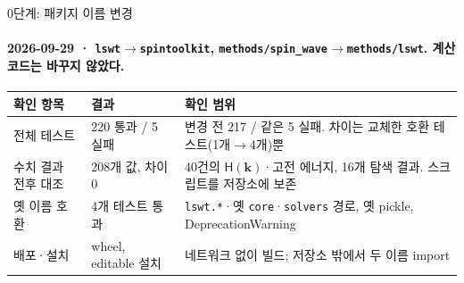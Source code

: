 \begin{frame}[label=rename-verification]{0단계: 패키지 이름 변경}
  \framesubtitle{2026-09-29 · \texttt{lswt}$\to$\texttt{spintoolkit}, \texttt{methods/spin\_wave}$\to$\texttt{methods/lswt}. 계산 코드는 바꾸지 않았다.}
  \begin{tabularx}{\textwidth}{@{}p{3.4cm}p{3.4cm}Y@{}}
    \toprule
    확인 항목 & 결과 & 확인 범위 \\
    \midrule
    전체 테스트 & 220 통과 / 5 실패 & 변경 전 217 / 같은 5 실패. 차이는 교체한 호환 테스트(1개$\to$4개)뿐 \\
    수치 결과 전후 대조 & 208개 값, 차이 0 & 40건의 $\mathsf H(\mathbf k)$·고전 에너지, 16개 탐색 결과. 스크립트를 저장소에 보존 \\
    옛 이름 호환 & 4개 테스트 통과 & \texttt{lswt.*}·옛 \texttt{core}·\texttt{solvers} 경로, 옛 pickle, DeprecationWarning \\
    배포·설치 & wheel, editable 설치 & 네트워크 없이 빌드; 저장소 밖에서 두 이름 import \\
    \bottomrule
  \end{tabularx}
  \par\medskip
\end{frame}

